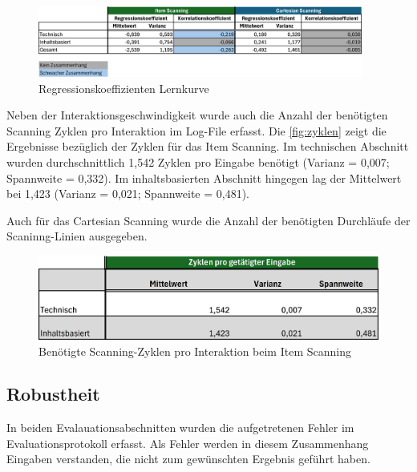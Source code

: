\begin{figure}[tbh]
    \centering
    \includegraphics[width=0.95\textwidth]{images/Results/Regressionskoeffizienten-Korrelation-Table-Lernkurve-Geschwindigkeit.png}
    \caption{Regressionskoeffizienten Lernkurve}
    \label{fig:RegressionskoeffizientenTable}
\end{figure}

Neben der Interaktionsgeschwindigkeit wurde auch die Anzahl der benötigten Scanning Zyklen pro Interaktion im Log-File erfasst. Die \autoref{fig:zyklen} zeigt die Ergebnisse bezüglich der Zyklen für das Item Scanning. Im technischen Abschnitt wurden durchschnittlich 1,542 Zyklen pro Eingabe benötigt (Varianz = 0,007; Spannweite = 0,332). Im inhaltsbasierten Abschnitt hingegen lag der Mittelwert bei 1,423 (Varianz = 0,021; Spannweite = 0,481).

Auch für das Cartesian Scanning wurde die Anzahl der benötigten Durchläufe der Scaninng-Linien ausgegeben. %

\begin{figure}[tbh]
    \centering
    \includegraphics{images/Results/Zyklen-Item.png}
    \caption{Benötigte Scanning-Zyklen pro Interaktion beim Item Scanning}
    \label{fig:zyklen}
\end{figure}

\subsection{Robustheit}

In beiden Evalauationsabschnitten wurden die aufgetretenen Fehler im Evaluationsprotokoll erfasst. Als Fehler werden in diesem Zusammenhang Eingaben verstanden, die nicht zum gewünschten Ergebnis geführt haben. 

